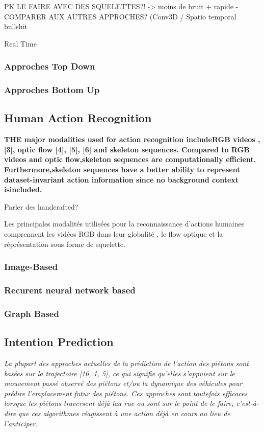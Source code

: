 PK LE FAIRE AVEC DES SQUELETTES?! -> moins de bruit + rapide
-COMPARER AUX AUTRES APPROCHES? (Conv3D / Spatio temporal bullshit

Real Time

\label{subsec:SQUEL}
\subsubsection{Approches Top Down}
\subsubsection{Approches Bottom Up}

\subsection{Human Action Recognition}
\textbf{THE major modalities used for action recognition includeRGB  videos  \cite{donahue2015long,2014arXiv1412.0767T},  [3],  optic  flow  [4],  [5],  [6]  and skeleton sequences. Compared to RGB videos and optic flow,skeleton sequences are computationally efficient. Furthermore,skeleton  sequences  have  a  better  ability  to  represent  dataset-invariant  action  information  since  no  background  context  isincluded.}

Parler des handcrafted?

Les principales modalités utilisées pour la reconnaissance d'actions humaines comprennent les vidéos RGB dans leur globalité \cite{donahue2015long,2014arXiv1412.0767T,varol2017long,Wu_2018_CVPR}, le flow optique \cite{simonyan2014two,zhang2016real,DanutPOP} et la réprésentation sous forme de squelette.

\label{subsec:HAR}

\subsubsection{Image-Based}
\subsubsection{Recurent neural network based}
\subsubsection{Graph Based}

\subsection{Intention Prediction}
\textit{La plupart des approches actuelles de la prédiction de l'action des piétons sont basées sur la trajectoire [16, 1, 5], ce qui signifie qu'elles s'appuient sur le mouvement passé observé des piétons et/ou la dynamique des véhicules pour prédire l'emplacement futur des piétons. Ces approches sont toutefois efficaces lorsque les piétons traversent déjà laa rue ou sont sur le point de le faire, c'est-à-dire que ces algorithmes réagissent à une action déjà en cours au lieu de l'anticiper.}


